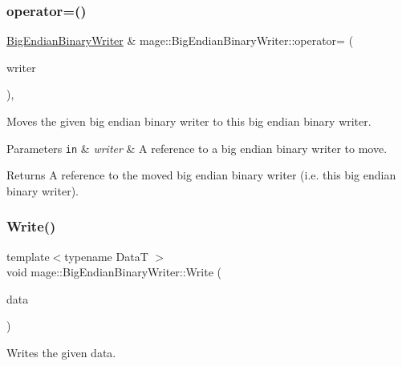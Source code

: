 \subsubsection{\texorpdfstring{operator=()}{operator=()}\hspace{0.1cm}{\footnotesize\ttfamily [2/2]}}
{\footnotesize\ttfamily \mbox{\hyperlink{classmage_1_1_big_endian_binary_writer}{Big\+Endian\+Binary\+Writer}} \& mage\+::\+Big\+Endian\+Binary\+Writer\+::operator= (\begin{DoxyParamCaption}\item[{\mbox{\hyperlink{classmage_1_1_big_endian_binary_writer}{Big\+Endian\+Binary\+Writer}} \&\&}]{writer }\end{DoxyParamCaption})\hspace{0.3cm}{\ttfamily [default]}, {\ttfamily [noexcept]}}

Moves the given big endian binary writer to this big endian binary writer.


\begin{DoxyParams}[1]{Parameters}
\mbox{\tt in}  & {\em writer} & A reference to a big endian binary writer to move. \\
\hline
\end{DoxyParams}
\begin{DoxyReturn}{Returns}
A reference to the moved big endian binary writer (i.\+e. this big endian binary writer). 
\end{DoxyReturn}
\mbox{\label{classmage_1_1_big_endian_binary_writer_a5df1ef09f8a9a452ffbe9fd3fad1a16a}} 
\subsubsection{\texorpdfstring{Write()}{Write()}}
{\footnotesize\ttfamily template$<$typename DataT $>$ \\
void mage\+::\+Big\+Endian\+Binary\+Writer\+::\+Write (\begin{DoxyParamCaption}\item[{const DataT \&}]{data }\end{DoxyParamCaption})\hspace{0.3cm}{\ttfamily [protected]}}

Writes the given data.


